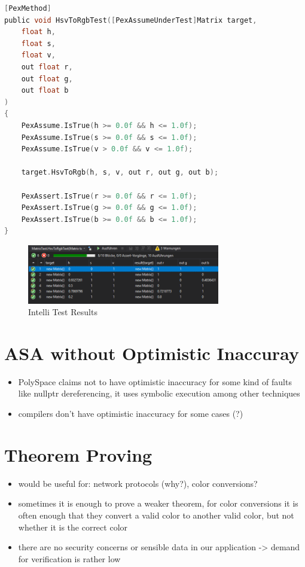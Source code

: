 \documentclass{scrreprt}
\begin{document}
\begin{lstlisting}[language=C]
[PexMethod]
public void HsvToRgbTest([PexAssumeUnderTest]Matrix target,
	float h,
	float s,
	float v,
	out float r,
	out float g,
	out float b
)
{
	PexAssume.IsTrue(h >= 0.0f && h <= 1.0f);
	PexAssume.IsTrue(s >= 0.0f && s <= 1.0f);
	PexAssume.IsTrue(v > 0.0f && v <= 1.0f);
	
	target.HsvToRgb(h, s, v, out r, out g, out b);
	
	PexAssert.IsTrue(r >= 0.0f && r <= 1.0f);
	PexAssert.IsTrue(g >= 0.0f && g <= 1.0f);
	PexAssert.IsTrue(b >= 0.0f && b <= 1.0f);
}
\end{lstlisting}

\begin{figure}[h]
	\centering
	\includegraphics[width=0.75\textwidth]{img/matrix_intelli_test.PNG}
	\caption[Intelli Test Results]{Intelli Test Results}
	\label{fig:matrix_intelli_test}
\end{figure}

\section{ASA without Optimistic Inaccuray}

\begin{itemize}
	\item PolySpace claims not to have optimistic inaccuracy for some kind of faults like nullptr dereferencing, it uses symbolic execution among other techniques
	\item compilers don't have optimistic inaccuracy for some cases (?)
\end{itemize}


\section{Theorem Proving}

\begin{itemize}
	\item would be useful for: network protocols (why?), color conversions?
	\item sometimes it is enough to prove a weaker theorem, for color conversions it is often enough that they convert a valid color to another valid color, but not whether it is the correct color
	\item there are no security concerns or sensible data in our application -> demand for verification is rather low
\end{itemize}
\end{document}

